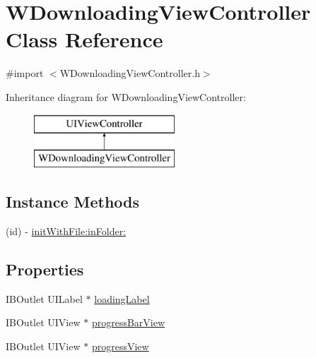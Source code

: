 \hypertarget{interface_w_downloading_view_controller}{\section{W\-Downloading\-View\-Controller Class Reference}
\label{interface_w_downloading_view_controller}
}


{\ttfamily \#import $<$W\-Downloading\-View\-Controller.\-h$>$}

Inheritance diagram for W\-Downloading\-View\-Controller\-:\begin{figure}[H]
\begin{center}
\leavevmode
\includegraphics[height=2.000000cm]{interface_w_downloading_view_controller}
\end{center}
\end{figure}
\subsection*{Instance Methods}
\begin{DoxyCompactItemize}
\item 
(id) -\/ \hyperlink{interface_w_downloading_view_controller_a223c45429c60ca65afd335a51ef49c53}{init\-With\-File\-:in\-Folder\-:}
\end{DoxyCompactItemize}
\subsection*{Properties}
\begin{DoxyCompactItemize}
\item 
I\-B\-Outlet U\-I\-Label $\ast$ \hyperlink{interface_w_downloading_view_controller_a06a9629718c14c68eff60a321732da75}{loading\-Label}
\item 
I\-B\-Outlet U\-I\-View $\ast$ \hyperlink{interface_w_downloading_view_controller_abbb1a4693db1c23335455c95b2ec14c5}{progress\-Bar\-View}
\item 
I\-B\-Outlet U\-I\-View $\ast$ \hyperlink{interface_w_downloading_view_controller_aab7f1b3df20f6c95a8e27320106777b0}{progress\-View}
\end{DoxyCompactItemize}


